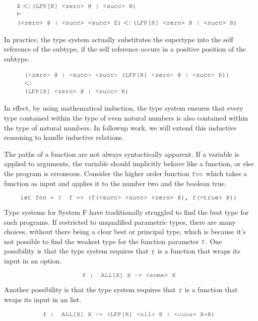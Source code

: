 \documentclass[acmsmall]{acmart}
\theoremstyle{definition}
\begin{document}
\[
  \begin{array}[t]{@{} l}
    \J{E} \subtypes \J{(LFP[R] <zero> @ | <succ> R)}
    \\
    \entails
    \\
    \J{(<zero> @ | <succ> <succ> E)} \subtypes \J{(LFP[R] <zero> @ | <succ> R)}
  \end{array}
\]

\noindent
In practice, the type system actually substitutes the supertype into
the self reference of the subtype, if the self reference occurs in a positive position of the subtype.

\[
  \begin{array}[t]{@{} l}
    \J{(<zero> @ | <succ> <succ> (LFP[R] <zero> @ | <succ> R))} 
    \\
    \subtypes 
    \\
    \J{(LFP[R] <zero> @ | <succ> R)}
  \end{array}
\]


In effect, by using mathematical induction, the type system ensures that 
every type contained within the type of even natural numbers is also
contained within the type of natural numbers.
In followup work, we will extend this inductive reasoning to handle inductive relations. 


The paths of a function are not always syntactically apparent. 
If a variable is applied to arguments, the variable should implicitly behave 
like a function, or else the program is erroneous. 
Consider the higher order function $\J{foo}$ which takes a function as input
and applies it to the number two and the boolean true.

\[
  \J{let foo = ? f => (f(<succ> <succ> <zero> @), f(<true> @))}
\]

Type systems for System F have traditionally struggled to find the best
type for such programs. If restricted to unqualified parametric types, there are many choices,
without there being a clear best or principal type, 
which is because it's not possible to find the weakest type for the function parameter
$\J{f}$.
One possibility is that the type system requires that $\J{f}$ is a function that wraps its
input in an option. 

\[
  \J{f : ALL[X] X -> <some> X}
\]

\noindent
Another possibility is that the type system requires that $\J{f}$ is a function that wraps its
input in an list. 

\[
  \J{f : ALL[X] X -> (LFP[R] <nil> @ | <cons> X*R)}
\]
\end{document}
